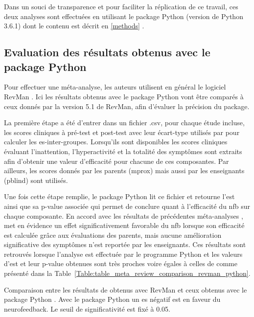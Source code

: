 Dans un souci de transparence et pour faciliter la réplication de ce travail, ces deux analyses sont effectuées en utilisant le package Python 
(version de Python 3.6.1) dont le contenu est décrit en \ref{methods} \citep{Bussalb2019c}. 

\subsection{Evaluation des résultats obtenus avec le package Python}

Pour effectuer une méta-analyse, les auteurs utilisent en général le logiciel RevMan \citep{Revman, Cortese2016, Micoulaud2014}. Ici les résultats 
obtenus avec le package Python vont être comparés à ceux donnés par la version 5.1 de RevMan, afin d'évaluer la précision du package. 

La première étape a été d'entrer dans un fichier .csv, pour chaque étude incluse, les scores cliniques à pré-test et post-test avec leur écart-type utilisés 
par \citet{Cortese2016} pour calculer les \gls{es}-inter-groupes. Lorsqu'ils sont disponibles les scores cliniques évaluant l'inattention, l'hyperactivité 
et la totalité des symptômes sont extraits afin d'obtenir une valeur d'efficacité pour chacune de ces composantes. Par ailleurs, les scores donnés par les
parents (\gls{mprox}) mais aussi par les enseignants (\gls{pblind}) sont utilisés.

Une fois cette étape remplie, le package Python lit ce fichier et retourne l'\gls{est} ainsi que sa p-value associée qui permet de conclure quant à l'efficacité
du \gls{nfb} sur chaque composante. En accord avec les résultats de précédentes méta-analyses \citep{Sonuga-Barke2013, Micoulaud2014}, \citet{Cortese2016}
met en évidence un effet significativement favorable du \gls{nfb} lorsque son efficacité est calculée grâce aux évaluations des parents, mais aucune amélioration 
significative des symptômes n'est reportée par les enseignants. Ces résultats sont retrouvés lorsque l'analyse est effectuée par le programme Python et les valeurs
d'\gls{est} et leur p-value obtenues sont très proches voire égales à celles de \citet{Cortese2016} comme présenté dans la 
Table~\ref{Table:table_meta_review_comparison_revman_python}. 

\begin{table}[h!]
  \centering
  \caption{Comparaison entre les résultats de \citet{Cortese2016} obtenus avec RevMan \citep{Revman} et ceux obtenus avec le package Python \citep{Bussalb2019clinical}.
	Avec le package Python un \gls{es} négatif est en faveur du neurofeedback. Le seuil de significativité est fixé à 0.05.}
  
  \label{Table:table_meta_review_comparison_revman_python}
\end{table}

